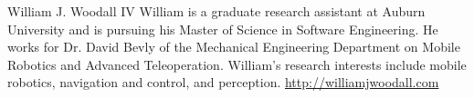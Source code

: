 \documentclass[journal]{IEEEtran}
\begin{document}
  
  
  
  \begin{IEEEbiography}
    {William J. Woodall IV}
      William is a graduate research assistant at Auburn University and is
      pursuing his Master of Science in Software Engineering. He works for Dr.
      David Bevly of the Mechanical Engineering Department on Mobile Robotics
      and Advanced Teleoperation. William's research interests include mobile
      robotics, navigation and control, and perception.
  \url{http://williamjwoodall.com}
  \end{IEEEbiography}
  
\end{document}

